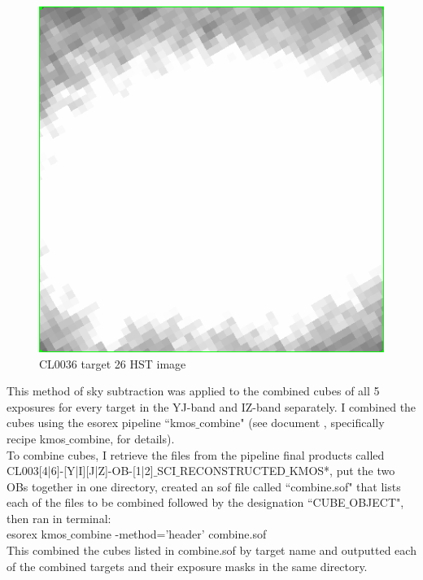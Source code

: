 \documentclass[10pt,letterpaper]{article}
\begin{document}
\begin{figure}[h!]
\caption{CL0036 target 26 HST image}\label{fig:CL0036 target 26 HST image}
\begin{center}
\includegraphics[scale=0.4]{figures/CL0036-Target_26.png}
\end{center}
\end{figure}

This method of sky subtraction was applied to the combined cubes of all 5 exposures for every target in the YJ-band and IZ-band separately. I combined the cubes using the esorex pipeline ``kmos$\_$combine" (see document \cite{KMOS pipeline manual}, specifically recipe kmos$\_$combine, for details).\\

To combine cubes, I retrieve the files from the pipeline final products called\\ CL003[4|6]-[Y|I][J|Z]-OB-[1|2]$\_$SCI$\_$RECONSTRUCTED$\_$KMOS*, put the two OBs together in one directory, created an sof file called ``combine.sof" that lists each of the files to be combined followed by the designation ``CUBE$\_$OBJECT", then ran in terminal:\\

esorex kmos$\_$combine -method='header' combine.sof\\

This combined the cubes listed in combine.sof by target name and outputted each of the combined targets and their exposure masks in the same directory.\\
\end{document}
